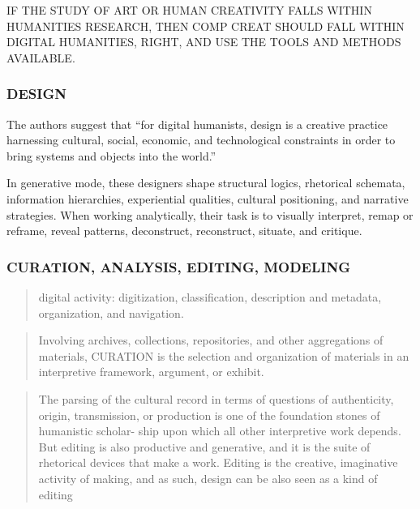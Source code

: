\begin{draft}
  IF THE STUDY OF ART OR HUMAN CREATIVITY FALLS WITHIN HUMANITIES RESEARCH, THEN COMP CREAT SHOULD FALL WITHIN DIGITAL HUMANITIES, RIGHT, AND USE THE TOOLS AND METHODS AVAILABLE.\@
\end{draft}

\subsubsection*{DESIGN}
The authors suggest that ``for digital humanists, design is a creative practice harnessing cultural, social, economic, and technological constraints in order to bring systems and objects into the world.'' \autocite[p.13]{Burdick2012}

In generative mode, these designers shape structural logics, rhetorical schemata, information hierarchies, experiential qualities, cultural positioning, and narrative strategies. When working analytically, their task is to visually interpret, remap or reframe, reveal patterns, deconstruct, reconstruct, situate, and critique. \autocite[p.12]{Burdick2012}

\subsubsection*{CURATION, ANALYSIS, EDITING, MODELING}
\begin{quote}
  digital activity: digitization, classification, description and metadata, organization, and navigation. \autocite[p.17]{Burdick2012}
\end{quote}

\begin{quote}
  Involving archives, collections, repositories, and other aggregations of materials, CURATION is the selection and organization of materials in an interpretive framework, argument, or exhibit. \autocite[p.17]{Burdick2012}
\end{quote}

\begin{quote}
  The parsing of the cultural record in terms of questions of authenticity, origin, transmission, or production is one of the foundation stones of humanistic scholar- ship upon which all other interpretive work depends. But editing is also productive and generative, and it is the suite of rhetorical devices that make a work. Editing is the creative, imaginative activity of making, and as such, design can be also seen as a kind of editing \autocite[p.18]{Burdick2012}
\end{quote}

